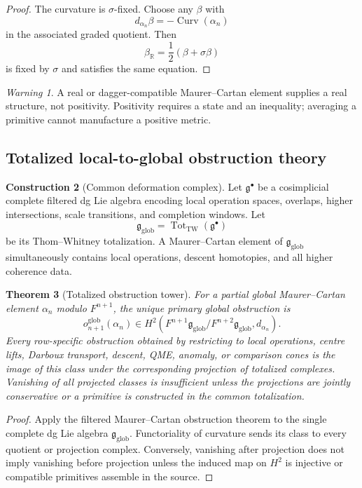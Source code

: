 \documentclass[11pt]{article}
\newtheorem{theorem}{Theorem}[section]
\theoremstyle{definition}
\newtheorem{construction}[theorem]{Construction}
\theoremstyle{remark}
\newtheorem{warning}[theorem]{Warning}
\DeclareMathOperator{\Tot}{Tot}
\newcommand{\RR}{\mathbb R}
\newcommand{\1}{\mathbf 1}
\newcommand{\cG}{\mathfrak g}
\begin{document}
\begin{proof}
The curvature is $\sigma$-fixed.  Choose any $\beta$ with
\[
d_{\alpha_n}\beta=-\operatorname{Curv}(\alpha_n)
\]
in the associated graded quotient.  Then
\[
\beta_{\RR}=\frac12(\beta+\sigma\beta)
\]
is fixed by $\sigma$ and satisfies the same equation.
\end{proof}

\begin{warning}
A real or dagger-compatible Maurer--Cartan element supplies a real structure, not positivity.  Positivity requires a state and an inequality; averaging a primitive cannot manufacture a positive metric.
\end{warning}

\subsection{Totalized local-to-global obstruction theory}

\begin{construction}[Common deformation complex]
Let $\cG^\bullet$ be a cosimplicial complete filtered dg Lie algebra encoding local operation spaces, overlaps, higher intersections, scale transitions, and completion windows.  Let
\[
\cG_{\mathrm{glob}}=\Tot_{\mathrm{TW}}(\cG^\bullet)
\]
be its Thom--Whitney totalization.  A Maurer--Cartan element of $\cG_{\mathrm{glob}}$ simultaneously contains local operations, descent homotopies, and all higher coherence data.
\end{construction}

\begin{theorem}[Totalized obstruction tower]
For a partial global Maurer--Cartan element $\alpha_n$ modulo $F^{n+1}$, the unique primary global obstruction is
\[
o^{\mathrm{glob}}_{n+1}(\alpha_n)
\in
H^2\left(
F^{n+1}\cG_{\mathrm{glob}}/F^{n+2}\cG_{\mathrm{glob}},
 d_{\alpha_n}
\right).
\]
Every row-specific obstruction obtained by restricting to local operations, centre lifts, Darboux transport, descent, QME, anomaly, or comparison cones is the image of this class under the corresponding projection of totalized complexes.  Vanishing of all projected classes is insufficient unless the projections are jointly conservative or a primitive is constructed in the common totalization.
\end{theorem}

\begin{proof}
Apply the filtered Maurer--Cartan obstruction theorem to the single complete dg Lie algebra $\cG_{\mathrm{glob}}$.  Functoriality of curvature sends its class to every quotient or projection complex.  Conversely, vanishing after projection does not imply vanishing before projection unless the induced map on $H^2$ is injective or compatible primitives assemble in the source.
\end{proof}
\end{document}
